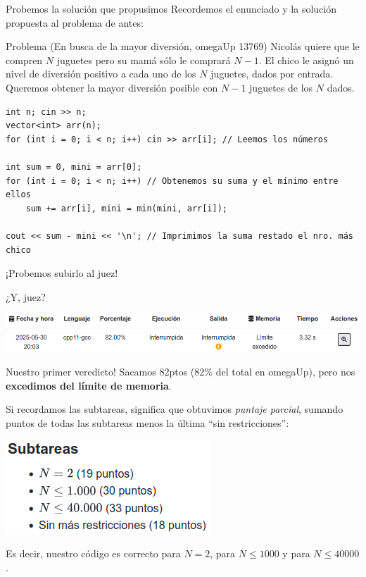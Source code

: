 \documentclass{beamer}
\begin{document}
    \begin{frame}[fragile]{Probemos la solución que propusimos}
        Recordemos el enunciado y la solución propuesta al problema de antes:\pause

        \begin{block}{Problema (En busca de la mayor diversión, omegaUp 13769)}
            Nicolás quiere que le compren $N$ juguetes pero su mamá sólo le comprará $N-1$. El chico le asignó un nivel de diversión positivo a cada uno de los $N$ juguetes, dados por entrada. Queremos obtener la mayor diversión posible con $N-1$ juguetes de los $N$ dados.
        \end{block}

        \pause
        \begin{verbatim}
int n; cin >> n;
vector<int> arr(n);
for (int i = 0; i < n; i++) cin >> arr[i]; // Leemos los números

int sum = 0, mini = arr[0];
for (int i = 0; i < n; i++) // Obtenemos su suma y el mínimo entre ellos
    sum += arr[i], mini = min(mini, arr[i]);

cout << sum - mini << '\n'; // Imprimimos la suma restado el nro. más chico
        \end{verbatim}
        \pause

        \begin{center}
            \LARGE ¡Probemos subirlo al juez!
        \end{center}
    \end{frame}

    \begin{frame}{¿Y, juez?}
        \pause
        \begin{center}
            \includegraphics[width=.9\linewidth]{./res/ou_problem_mle.png}
        \end{center} \pause

        Nuestro primer veredicto! \pause Sacamos 82ptos (82\% del total en omegaUp), pero nos \textbf{excedimos del límite de memoria}. \pause 

        Si recordamos las subtareas, significa que obtuvimos \textit{puntaje parcial}, sumando puntos de todas las subtareas menos la última ``sin restricciones'':

        \begin{center}
            \includegraphics[width=.25\linewidth]{./res/ou_subtasks.png}
        \end{center}\pause

        Es decir, nuestro código es correcto para $N = 2$, para $N \leq 1000$ y para $N \leq 40000$. 
    \end{frame}
\end{document}
